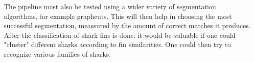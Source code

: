 \documentclass[a4paper,10pt]{article}
\begin{document}
The pipeline must also be tested using a wider variety of segmentation algorithms, for example graphcuts. This will then help in choosing the most successful segmentation,
meassured by the amount of correct matches it produces. \\ 

After the classification of shark fins is done, it would be valuable if one could "cluster" different sharks according to fin similarities.
One could then try to recognize various families of sharks. \\

\newpage

\end{document}
